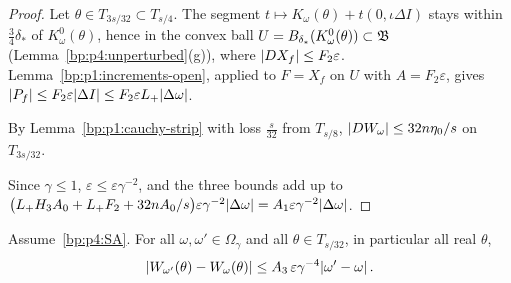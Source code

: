 \begin{proof}
\label{step:p4:le-f}
Let $\theta\in T_{3s/32}\subset T_{s/4}$. The segment $t\mapsto K_\omega(\theta)+t(0,\iota\Delta I)$
stays within $\frac34\delta_*$ of $K^0_\omega(\theta)$, hence in the convex ball
$U=B_{\delta_*}(K^0_\omega(\theta))\subset\mathfrak{B}$ (Lemma~\ref{bp:p4:unperturbed}(g)), where
$\lvert DX_f\rvert\le F_2\varepsilon$. Lemma~\ref{bp:p1:increments-open}, applied to $F=X_f$ on $U$ with
$A=F_2\varepsilon$, gives $\lvert P_f\rvert\le F_2\varepsilon\lvert \Delta I\rvert\le F_2\varepsilon L_{+}\lvert \Delta\omega\rvert$.

\label{step:p4:le-transport}
By Lemma~\ref{bp:p1:cauchy-strip} with loss $\frac s{32}$ from $T_{s/8}$,
$\lvert DW_\omega\rvert\le32n\eta_0/s$ on $T_{3s/32}$.

\label{step:p4:le-sum}
Since $\gamma\le1$, $\varepsilon\le\varepsilon\gamma^{-2}$, and the three bounds add up to
$\bigl(L_{+} H_3A_0+L_{+} F_2+32nA_0/s\bigr)\varepsilon\gamma^{-2}\lvert \Delta\omega\rvert=A_1\varepsilon\gamma^{-2}\lvert \Delta\omega\rvert$.
\end{proof}

\begin{theorem}[LIP]\label{bp:p4:lip}
Assume~\eqref{bp:p4:SA}. For all $\omega,\omega'\in\Omega_\gamma$ and all $\theta\in T_{s/32}$, in
particular all real $\theta$,
\begin{equation*}
\lvert W_{\omega'}(\theta)-W_\omega(\theta)\rvert\le A_3\,\varepsilon\gamma^{-4}\lvert \omega'-\omega\rvert\,.
\end{equation*}
\end{theorem}

